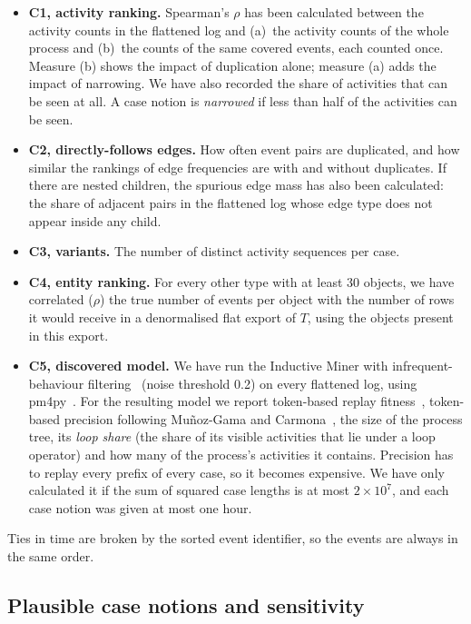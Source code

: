 \documentclass[pdflatex,sn-mathphys-num]{sn-jnl}
\begin{document}
\begin{itemize}
\item \textbf{C1, activity ranking.} Spearman's $\rho$ has been calculated between the activity counts in the flattened log and (a)~the activity counts of the whole process and (b)~the counts of the same covered events, each counted once. Measure (b) shows the impact of duplication alone; measure (a) adds the impact of narrowing. We have also recorded the share of activities that can be seen at all. A case notion is \emph{narrowed} if less than half of the activities can be seen.
\item \textbf{C2, directly-follows edges.} How often event pairs are duplicated, and how similar the rankings of edge frequencies are with and without duplicates. If there are nested children, the spurious edge mass has also been calculated: the share of adjacent pairs in the flattened log whose edge type does not appear inside any child.
\item \textbf{C3, variants.} The number of distinct activity sequences per case.
\item \textbf{C4, entity ranking.} For every other type with at least 30 objects, we have correlated ($\rho$) the true number of events per object with the number of rows it would receive in a denormalised flat export of $T$, using the objects present in this export.
\item \textbf{C5, discovered model.} We have run the Inductive Miner with infrequent-behaviour filtering~\cite{leemans2014infrequent} (noise threshold 0.2) on every flattened log, using pm4py~\cite{berti2023pm4py}. For the resulting model we report token-based replay fitness~\cite{berti2019tbr}, token-based precision following Mu\~{n}oz-Gama and Carmona~\cite{munozgama2010precision}, the size of the process tree, its \emph{loop share} (the share of its visible activities that lie under a loop operator) and how many of the process's activities it contains. Precision has to replay every prefix of every case, so it becomes expensive. We have only calculated it if the sum of squared case lengths is at most $2 \times 10^7$, and each case notion was given at most one hour.
\end{itemize}

Ties in time are broken by the sorted event identifier, so the events are always in the same order.

\subsection{Plausible case notions and sensitivity}\label{sec:plausible}
\end{document}
